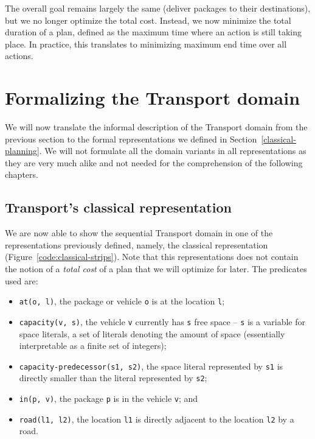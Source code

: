 The overall goal remains largely the same (deliver packages to their destinations), but we no longer optimize the total cost. Instead, we now minimize the total duration of a plan,
defined as the maximum time where an action is still taking place.
In practice, this translates to minimizing maximum end time over all actions.



















\section{Formalizing the Transport domain}

We will now translate the informal description of the Transport domain from the previous section to the formal representations we defined in Section~\ref{classical-planning}. We will not formulate all the domain variants in all representations as
they are very much alike and not needed for the comprehension of the following chapters.

\subsection{Transport's classical representation}\label{transport-classical-representation}

We are now able to show the sequential Transport domain in one of the representations
previously defined, namely,
the classical representation (Figure~\ref{code:classical-strips}).
Note that this representations does not contain the notion of a \textit{total cost}
of a plan that we will optimize for later.
The predicates used are:

\begin{itemize}
\item \verb+at(o, l)+, the package or vehicle \verb+o+ is at the
location \verb+l+;
\item \verb+capacity(v, s)+, the vehicle \verb+v+ currently has \verb+s+ free space -- \verb+s+ is a variable for space literals, a set of literals denoting the amount of space (essentially interpretable as a finite set of integers);
\item \verb+capacity-predecessor(s1, s2)+, the space literal represented by \verb+s1+
is directly smaller than the literal represented by \verb+s2+;
\item \verb+in(p, v)+, the package \verb+p+ is in the vehicle \verb+v+; and
\item \verb+road(l1, l2)+, the location \verb+l1+ is directly adjacent to the location
\verb+l2+ by a road.
\end{itemize}

